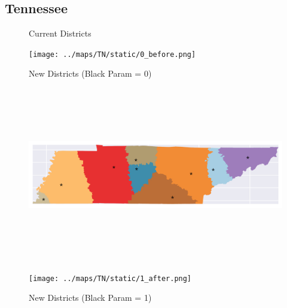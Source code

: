 \subsection{Tennessee}
\begin{figure}[htb!] \centering
\caption{ Current Districts }
\texttt{[image: ../maps/TN/static/0\_before.png]}
\caption{ New Districts (Black Param = 0) }
\includegraphics[width=5in,height=3in,keepaspectratio]{../maps/TN/static/0_after.png}
\caption{ New Districts (Black Param = 1) }
\texttt{[image: ../maps/TN/static/1\_after.png]}
\end{figure}

\clearpage
\newpage

